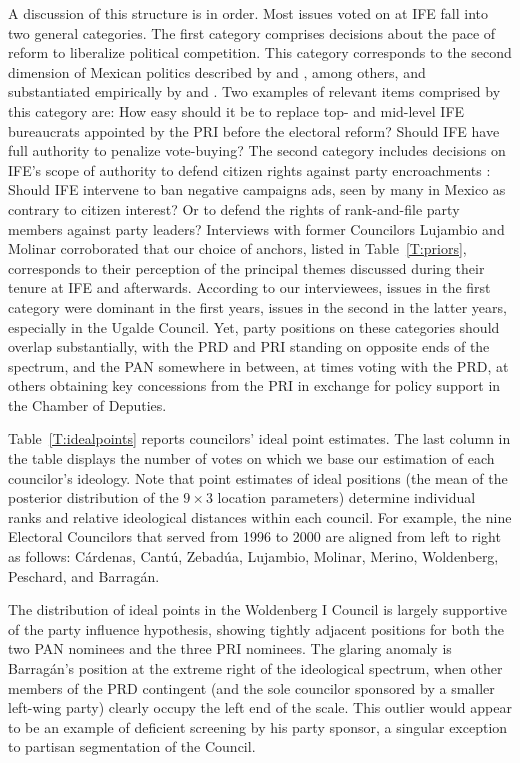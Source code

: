 \documentclass[12 pt, letter]{article}
\begin{document}
A discussion of this structure is in order. Most issues voted on at IFE fall into two general categories. The first category comprises decisions about the pace of reform to liberalize political competition. This category corresponds to the second dimension of Mexican politics described by \citet{Molinar1991} and \citet{Lujambio2001}, among others, and substantiated empirically by \citet{Moreno2003a} and \citet{Magaloni2006}.  Two examples of relevant items comprised by this category are: How easy should it be to replace top- and mid-level IFE bureaucrats appointed by the PRI before the electoral reform? Should IFE have full authority to penalize vote-buying?  The second category includes decisions on IFE's scope of authority to defend citizen rights against party encroachments \citep[cf.][]{Cardenas2004}: Should IFE intervene to ban negative campaigns ads, seen by many in Mexico as contrary to citizen interest? Or to defend the rights of rank-and-file party members against party leaders? Interviews with former Councilors Lujambio and Molinar corroborated that our choice of anchors, listed in Table~\ref{T:priors}, corresponds  to their perception of the principal themes discussed during their tenure at IFE and afterwards.  According to our interviewees, issues in the first category were dominant in the first years, issues in the second in the latter years, especially in the Ugalde Council. Yet, party positions on these  categories should overlap substantially, with the PRD and PRI standing on opposite ends of the spectrum, and the PAN somewhere in between, at times voting with the PRD, at others obtaining key concessions from the PRI in exchange for policy support in the Chamber of Deputies.

Table~\ref{T:idealpoints} reports councilors' ideal point estimates.  The last column in the table displays the number of votes on which we base our estimation of each councilor's ideology. Note that point estimates of ideal positions (the mean of the posterior distribution of the $9 \times 3$ location parameters) determine individual ranks and relative ideological distances within each council.  For example, the nine Electoral Councilors that served from 1996 to 2000 are aligned from left to right as follows: C\'ardenas, Cant\'u, Zebad\'ua, Lujambio, Molinar, Merino, Woldenberg, Peschard, and Barrag\'an.

The distribution of ideal points in the Woldenberg I Council is largely supportive of the party influence hypothesis, showing tightly adjacent positions for both the two PAN nominees and the three PRI nominees.  The glaring anomaly is Barrag\'an's position at the extreme right of the ideological spectrum, when other members of the PRD contingent (and the sole councilor sponsored by a smaller left-wing party) clearly occupy the left end of the scale.  This outlier would appear to be an example of deficient screening by his party sponsor, a singular exception to partisan segmentation of the Council.
\end{document}

